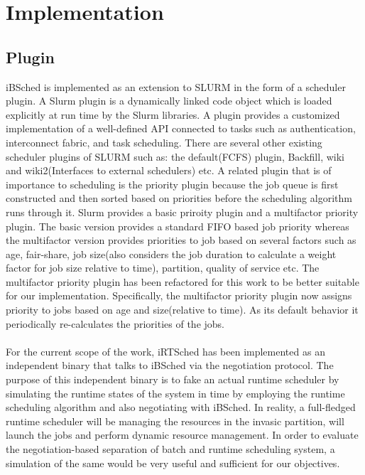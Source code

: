 \chapter{Implementation}\label{chapter:implementation}
\section{Plugin}
iBSched is implemented as an extension to SLURM in the form of a scheduler plugin. A Slurm plugin is a dynamically linked code object which is loaded explicitly at run time by the Slurm libraries. A plugin provides a customized implementation of a well-defined API connected to tasks such as authentication, interconnect fabric, and task scheduling. There are several other existing scheduler plugins of SLURM such as: the default(FCFS) plugin, Backfill, wiki and wiki2(Interfaces to external schedulers) etc. A related plugin that is of importance to scheduling is the priority plugin because the job queue is first constructed and then sorted based on priorities before the scheduling algorithm runs through it. Slurm provides a basic priroity plugin and a multifactor priority plugin. The basic version provides a standard FIFO based job priority whereas the multifactor version provides priorities to job based on several factors such as age, fair-share, job size(also considers the job duration to calculate a weight factor for job size relative to time), partition, quality of service etc. The multifactor priority plugin has been refactored for this work to be better suitable for our implementation. Specifically, the multifactor priority plugin now assigns priority to jobs based on age and size(relative to time). As its default behavior it periodically re-calculates the priorities of the jobs.\\ \\
For the current scope of the work, iRTSched has been implemented as an independent binary that talks to iBSched via the negotiation protocol. The purpose of this independent binary is to fake an actual runtime scheduler by simulating the runtime states of the system in time by employing the runtime scheduling algorithm and also negotiating with iBSched. In reality, a full-fledged runtime scheduler will be managing the resources in the invasic partition, will launch the jobs and perform dynamic resource management. In order to evaluate the negotiation-based separation of batch and runtime scheduling system, a simulation of the same would be very useful and sufficient for our objectives. 
